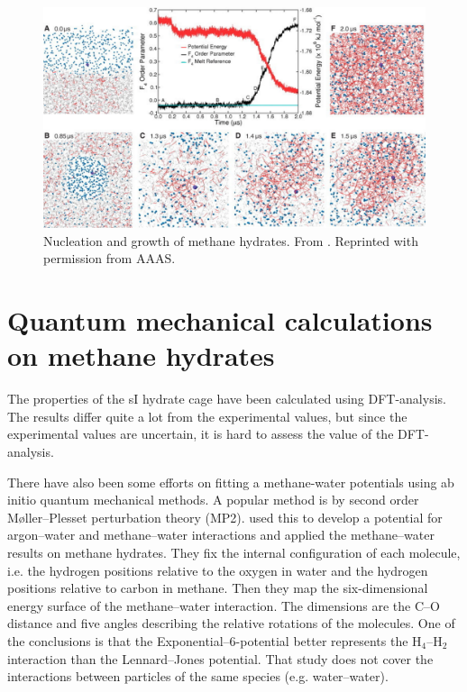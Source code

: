 \begin{figure}
\centering
\includegraphics[width=\textwidth]{../pictures/methane_hydrate_growth.pdf}
\caption{Nucleation and growth of methane hydrates. From \citet{Walsh2009}. Reprinted with permission from AAAS.}
\label{fig:methane_hydrate_growth}
\end{figure}

\section{Quantum mechanical calculations on methane hydrates}
The properties of the sI hydrate cage have been calculated using DFT-analysis. The results differ quite a lot from the experimental values, but since the experimental values are uncertain, it is hard to assess the value of the DFT-analysis.

There have also been some efforts on fitting a methane-water potentials using ab initio quantum mechanical methods. A popular method is by second order Møller--Plesset perturbation theory (MP2). \citet{Anderson2004} used this to develop a potential for argon--water and methane--water interactions and applied the methane--water results on methane hydrates. They fix the internal configuration of each molecule, i.e. the hydrogen positions relative to the oxygen in water and the hydrogen positions relative to carbon in methane. Then they map the six-dimensional energy surface of the methane--water interaction. The dimensions are the C--O distance and five angles describing the relative rotations of the molecules. One of the conclusions is that the Exponential--6-potential better represents the H$_4$--H$_2$ interaction than the Lennard--Jones potential. That study does not cover the interactions between particles of the same species (e.g. water--water).


